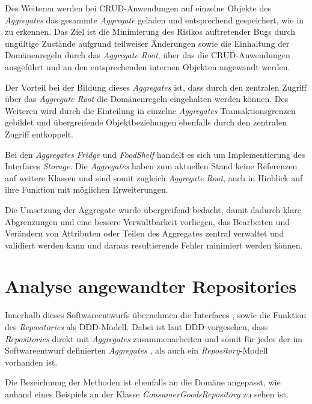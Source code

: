 Des Weiteren werden bei \ac{CRUD}-Anwendungen auf einzelne Objekte des \textit{Aggregates} das gesammte \textit{Aggregate} geladen und entsprechend gespeichert, wie in \href{}{} zu erkennen.
Das Ziel ist die Minimierung des Risikos auftretender Bugs durch ungültige Zustände aufgrund teilweiser Änderungen sowie die Einhaltung der Domänenregeln durch das \textit{Aggregate Root}, über das die \ac{CRUD}-Anwendungen ausgeführt und an den entsprechenden internen Objekten angewandt werden.

Der Vorteil bei der Bildung dieses \textit{Aggregates} ist, dass durch den zentralen Zugriff über das \textit{Aggregate Root} die Domänenregeln eingehalten werden können.
Des Weiteren wird durch die Einteilung in einzelne \textit{Aggregates} Transaktionsgrenzen gebildet und übergreifende Objektbeziehungen ebenfalls durch den zentralen Zugriff entkoppelt.

Bei den \textit{Aggregates} \href{}{\code{}}\textit{Fridge} und \href{}{\code{}}\textit{FoodShelf} handelt es sich um Implementierung des Interfaces \href{}{\code{}}\textit{Storage}.
Die \textit{Aggregates} haben zum aktuellen Stand keine Referenzen auf weitere Klassen und sind somit zugleich \textit{Aggregate Root}, auch in Hinblick auf ihre Funktion mit möglichen Erweiterungen.

Die Umsetzung der Aggregate wurde übergreifend bedacht, damit dadurch klare Abgrenzungen und eine bessere Verwaltbarkeit vorliegen, das Bearbeiten und Verändern von Attributen oder Teilen des Aggregates zentral verwaltet und validiert werden kann und daraus resultierende Fehler minimiert werden können.

\section{Analyse angewandter Repositories}
\label{domaindrivendesign>repositories}
Innerhalb dieses Softwareentwurfs übernehmen die Interfaces \href{}{}, \href{}{} sowie \href{}{} die Funktion des \textit{Repositories} als \ac{DDD}-Modell.
Dabei ist laut \ac{DDD} vorgesehen, dass \textit{Repositories} direkt mit \textit{Aggregates} zusammenarbeiten und somit für jedes der im Softwareentwurf definierten \textit{Aggregates} \href{}{}, \href{}{} als auch \href{}{} ein \textit{Repository}-Modell vorhanden ist.

Die Bezeichnung der Methoden ist ebenfalls an die Domäne angepasst, wie anhand eines Beispiels an der Klasse \href{}{\code{}}\textit{ConsumerGoodsRepository} zu sehen ist.

